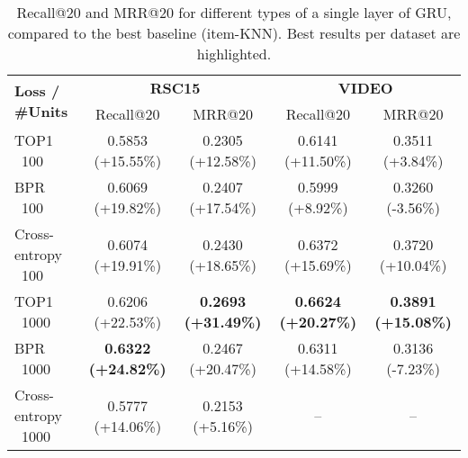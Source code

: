 \begin{table}
\centering
\caption{Recall@20 and MRR@20 for different types of a single layer of GRU, compared to the best baseline (item-KNN). Best results per dataset are highlighted.}\label{tab:results}
\medskip
{\small
\begin{tabular}{lcccc}
\toprule
\multirow{2}{*}{\textbf{Loss / \#Units}} & \multicolumn{2}{c}{\textbf{RSC15}} & \multicolumn{2}{c}{\textbf{VIDEO}} \\
& Recall@20 & MRR@20 & Recall@20 & MRR@20 \\
\midrule
TOP1 \ 100 & 0.5853 (+15.55\%) & 0.2305 (+12.58\%) & 0.6141 (+11.50\%) & 0.3511 (+3.84\%)\\
BPR \ 100 & 0.6069 (+19.82\%) & 0.2407 (+17.54\%) & 0.5999 (+8.92\%) & 0.3260 (-3.56\%)\\
Cross-entropy \ 100 & 0.6074 (+19.91\%) & 0.2430 (+18.65\%) & 0.6372 (+15.69\%) & 0.3720 (+10.04\%)\\
TOP1 \ 1000 & 0.6206 (+22.53\%) & \textbf{0.2693 (+31.49\%)} & \textbf{0.6624 (+20.27\%)} & \textbf{0.3891 (+15.08\%)}\\
BPR \ 1000 & \textbf{0.6322 (+24.82\%)} & 0.2467 (+20.47\%) & 0.6311 (+14.58\%) & 0.3136 (-7.23\%)\\
Cross-entropy \ 1000 & 0.5777 (+14.06\%) & 0.2153 (+5.16\%) & -- & -- \\
\bottomrule
\end{tabular}}
\end{table}

